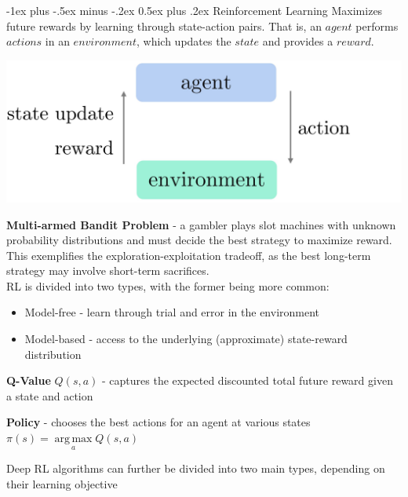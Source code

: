 \documentclass[10pt,landscape]{article}
\makeatletter
\DeclareMathOperator*{\argmax}{arg\,max}
\renewcommand{\section}{\@startsection{section}{1}{0mm}%
                                {-1ex plus -.5ex minus -.2ex}%
                                {0.5ex plus .2ex}%
                                {\normalfont\large\bfseries}}
\makeatother
\begin{document}
\begin{multicols}{3}
    \section{Reinforcement Learning}
    Maximizes future rewards by learning through state-action pairs. That is, an $agent$ performs $actions$ in an $environment$, which updates the $state$ and provides a $reward$.

    \begin{center}
        \vspace{-2mm}
        \includegraphics[scale = .085]{images/reinforcement4.JPG}
    \end{center}
    \vspace{-2.5mm}
    \textbf{Multi-armed Bandit Problem} - a gambler plays slot machines with unknown probability distributions and must decide the best strategy to maximize reward. This exemplifies the exploration-exploitation tradeoff, as the best long-term strategy may involve short-term sacrifices.\\
    \smallskip
    RL is divided into two types, with the former being more common:
    \begin{itemize}[label={--},leftmargin=4mm]
        \itemsep -.4mm
        \item Model-free - learn through trial and error in the environment
        \item Model-based - access to the underlying (approximate) state-reward distribution
    \end{itemize}

    \textbf{Q-Value} $Q(s,a)$ - captures the expected discounted total future reward given a state and action

    \textbf{Policy} - chooses the best actions for an agent at various states \\
    $ \pi(s) = \argmax\limits_a Q(s,a)$\\
    \smallskip

    Deep RL algorithms can further be divided into two main types, depending on their learning objective


\end{multicols}
\end{document}

